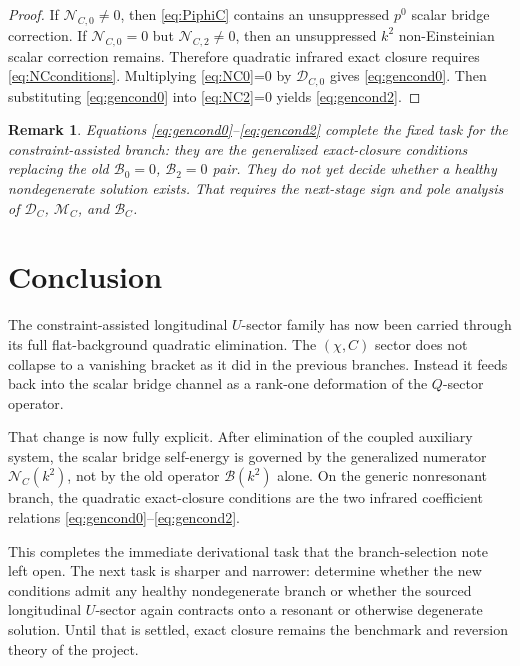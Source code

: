 \documentclass[11pt]{article}
\newtheorem{remark}{Remark}
\begin{document}
\begin{proof}
If \(\mathcal N_{C,0}\neq0\), then \eqref{eq:PiphiC} contains an unsuppressed \(p^0\) scalar bridge correction. If \(\mathcal N_{C,0}=0\) but \(\mathcal N_{C,2}\neq0\), then an unsuppressed \(k^2\) non-Einsteinian scalar correction remains. Therefore quadratic infrared exact closure requires \eqref{eq:NCconditions}. Multiplying \eqref{eq:NC0}=0 by \(\mathcal D_{C,0}\) gives \eqref{eq:gencond0}. Then substituting \eqref{eq:gencond0} into \eqref{eq:NC2}=0 yields \eqref{eq:gencond2}.
\end{proof}

\begin{remark}
Equations \eqref{eq:gencond0}--\eqref{eq:gencond2} complete the fixed task for the constraint-assisted branch: they are the generalized exact-closure conditions replacing the old \(\mathcal B_0=0\), \(\mathcal B_2=0\) pair. They do \emph{not} yet decide whether a healthy nondegenerate solution exists. That requires the next-stage sign and pole analysis of \(\mathcal D_C\), \(\mathcal M_C\), and \(\mathcal B_C\).
\end{remark}

\section{Conclusion}

The constraint-assisted longitudinal \(U\)-sector family has now been carried through its full flat-background quadratic elimination. The \((\chi,C)\) sector does not collapse to a vanishing bracket as it did in the previous branches. Instead it feeds back into the scalar bridge channel as a rank-one deformation of the \(Q\)-sector operator.

That change is now fully explicit. After elimination of the coupled auxiliary system, the scalar bridge self-energy is governed by the generalized numerator \(\mathcal N_C(k^2)\), not by the old operator \(\mathcal B(k^2)\) alone. On the generic nonresonant branch, the quadratic exact-closure conditions are the two infrared coefficient relations \eqref{eq:gencond0}--\eqref{eq:gencond2}.

This completes the immediate derivational task that the branch-selection note left open. The next task is sharper and narrower: determine whether the new conditions admit any healthy nondegenerate branch or whether the sourced longitudinal \(U\)-sector again contracts onto a resonant or otherwise degenerate solution. Until that is settled, exact closure remains the benchmark and reversion theory of the project.
\end{document}
